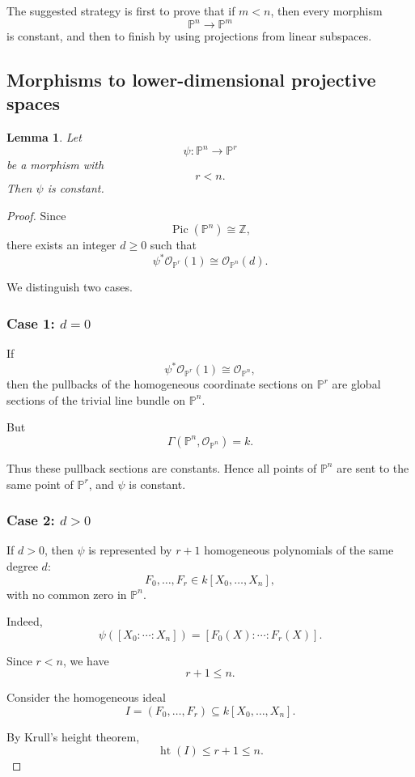\documentclass[12pt,a4paper]{article}
\newcommand{\OO}{\mathcal{O}}
\newtheorem{lemma}[theorem]{Lemma}
\newcommand{\Pic}{\operatorname{Pic}}
\newcommand{\Z}{\mathbb{Z}}
\providecommand{\Pj}{\mathbb P}
\theoremstyle{notespace}
\begin{document}
The suggested strategy is first to prove that if \(m<n\), then every morphism
\[
\Pj^n\longrightarrow \Pj^m
\]
is constant, and then to finish by using projections from linear subspaces.

\subsection{Morphisms to lower-dimensional projective spaces}

\begin{lemma}
	Let
	\[
	\psi:\Pj^n\longrightarrow \Pj^r
	\]
	be a morphism with
	\[
	r<n.
	\]
	Then \(\psi\) is constant.
\end{lemma}

\begin{proof}
	Since
	\[
	\Pic(\Pj^n)\cong \Z,
	\]
	there exists an integer \(d\geq 0\) such that
	\[
	\psi^*\OO_{\Pj^r}(1)\cong \OO_{\Pj^n}(d).
	\]
	
	We distinguish two cases.
	
	\subsubsection*{Case 1: \(d=0\)}
	
	If
	\[
	\psi^*\OO_{\Pj^r}(1)\cong \OO_{\Pj^n},
	\]
	then the pullbacks of the homogeneous coordinate sections on \(\Pj^r\) are global sections of the trivial line bundle on \(\Pj^n\).
	
	But
	\[
	\Gamma(\Pj^n,\OO_{\Pj^n})=k.
	\]
	
	Thus these pullback sections are constants. Hence all points of \(\Pj^n\) are sent to the same point of \(\Pj^r\), and \(\psi\) is constant.
	
	\subsubsection*{Case 2: \(d>0\)}
	
	If \(d>0\), then \(\psi\) is represented by \(r+1\) homogeneous polynomials of the same degree \(d\):
	\[
	F_0,\dots,F_r\in k[X_0,\dots,X_n],
	\]
	with no common zero in \(\Pj^n\).
	
	Indeed,
	\[
	\psi([X_0:\cdots:X_n])
	=
	[F_0(X):\cdots:F_r(X)].
	\]
	
	Since \(r<n\), we have
	\[
	r+1\leq n.
	\]
	
	Consider the homogeneous ideal
	\[
	I=(F_0,\dots,F_r)\subseteq k[X_0,\dots,X_n].
	\]
	
	By Krull's height theorem,
	\[
	\operatorname{ht}(I)\leq r+1\leq n.
	\]
	

\end{proof}
\end{document}
